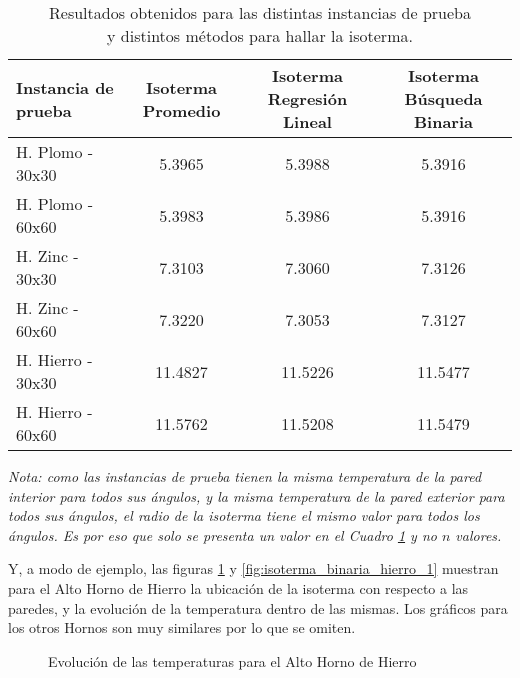 \begin{table}[H]
    \begin{center}
        \begin{tabular}{| l | c | c | c |}
            \hline
            Instancia de prueba & Isoterma Promedio & Isoterma Regresión Lineal & Isoterma Búsqueda Binaria \\ \hline
            H. Plomo - 30x30    & 5.3965            & 5.3988                    & 5.3916                    \\
            H. Plomo - 60x60    & 5.3983            & 5.3986                    & 5.3916                    \\
            H. Zinc - 30x30     & 7.3103            & 7.3060                    & 7.3126                    \\
            H. Zinc - 60x60     & 7.3220            & 7.3053                    & 7.3127                    \\
            H. Hierro - 30x30   & 11.4827           & 11.5226                   & 11.5477                   \\
            H. Hierro - 60x60   & 11.5762           & 11.5208                   & 11.5479                   \\
            \hline
        \end{tabular}
        \captionsetup{justification=centering}
        \caption{Resultados obtenidos para las distintas instancias de prueba\\ y distintos métodos para hallar la isoterma.}
        \label{tablaisoterma}
    \end{center}
\end{table}
\textit{Nota: como las instancias de prueba tienen la misma temperatura de la pared interior para todos sus ángulos, y la misma temperatura de la pared exterior para todos sus ángulos, el radio de la isoterma tiene el mismo valor para todos los ángulos. Es por eso que solo se presenta un valor en el Cuadro \ref{tablaisoterma} y no $n$ valores.}

\medskip

Y, a modo de ejemplo, las figuras \ref{fig:solucion_hierro_1} y \ref{fig:isoterma_binaria_hierro_1} muestran para el Alto Horno de Hierro la ubicación de la isoterma con respecto a las paredes, y la evolución de la temperatura dentro de las mismas. Los gráficos para los otros Hornos son muy similares por lo que se omiten.

\begin{figure}[H]
    \begin{center}
        \caption{Evolución de las temperaturas para el Alto Horno de Hierro}
        \label{fig:solucion_hierro_1}
    \end{center}
\end{figure}

